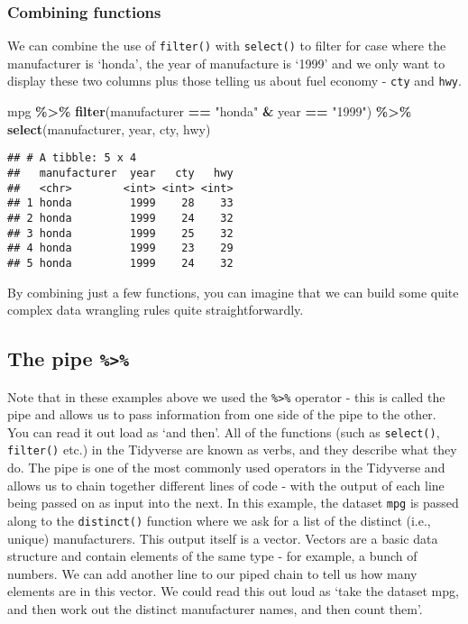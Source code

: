 \documentclass[
]{book}
\newenvironment{Shaded}{\begin{snugshade}}{\end{snugshade}}
\newcommand{\FunctionTok}[1]{\textcolor[rgb]{0.13,0.29,0.53}{\textbf{#1}}}
\newcommand{\NormalTok}[1]{#1}
\newcommand{\SpecialCharTok}[1]{\textcolor[rgb]{0.81,0.36,0.00}{\textbf{#1}}}
\newcommand{\StringTok}[1]{\textcolor[rgb]{0.31,0.60,0.02}{#1}}
\begin{document}
\hypertarget{combining-functions}{%
\subsubsection*{Combining functions}\label{combining-functions}}

We can combine the use of \texttt{filter()} with \texttt{select()} to filter for case where the manufacturer is `honda', the year of manufacture is `1999' and we only want to display these two columns plus those telling us about fuel economy - \texttt{cty} and \texttt{hwy}.

\begin{Shaded}
\begin{Highlighting}[]
\NormalTok{mpg }\SpecialCharTok{\%\textgreater{}\%} 
  \FunctionTok{filter}\NormalTok{(manufacturer }\SpecialCharTok{==} \StringTok{"honda"} \SpecialCharTok{\&}\NormalTok{ year }\SpecialCharTok{==} \StringTok{"1999"}\NormalTok{) }\SpecialCharTok{\%\textgreater{}\%}
  \FunctionTok{select}\NormalTok{(manufacturer, year, cty, hwy)}
\end{Highlighting}
\end{Shaded}

\begin{verbatim}
## # A tibble: 5 x 4
##   manufacturer  year   cty   hwy
##   <chr>        <int> <int> <int>
## 1 honda         1999    28    33
## 2 honda         1999    24    32
## 3 honda         1999    25    32
## 4 honda         1999    23    29
## 5 honda         1999    24    32
\end{verbatim}

By combining just a few functions, you can imagine that we can build some quite complex data wrangling rules quite straightforwardly.

\hypertarget{the-pipe}{%
\subsection{\texorpdfstring{The pipe \texttt{\%\textgreater{}\%}}{The pipe \%\textgreater\%}}\label{the-pipe}}

Note that in these examples above we used the \texttt{\%\textgreater{}\%} operator - this is called the pipe and allows us to pass information from one side of the pipe to the other. You can read it out load as `and then'. All of the functions (such as \texttt{select()}, \texttt{filter()} etc.) in the Tidyverse are known as verbs, and they describe what they do. The pipe is one of the most commonly used operators in the Tidyverse and allows us to chain together different lines of code - with the output of each line being passed on as input into the next. In this example, the dataset \texttt{mpg} is passed along to the \texttt{distinct()} function where we ask for a list of the distinct (i.e., unique) manufacturers. This output itself is a vector. Vectors are a basic data structure and contain elements of the same type - for example, a bunch of numbers. We can add another line to our piped chain to tell us how many elements are in this vector. We could read this out loud as `take the dataset mpg, and then work out the distinct manufacturer names, and then count them'.
\end{document}
